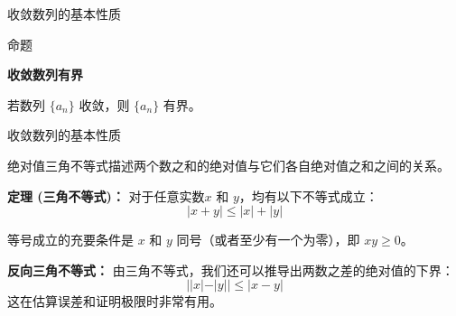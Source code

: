 \documentclass[aspectratio=169,10pt,fontset=fandol]{ctexbeamer}
\newenvironment{custom}[1]{\par\noindent\textbf{#1}\quad}{\par\vspace{0.8em}}
\begin{document}
\begin{frame}[t,fragile]{收敛数列的基本性质}
\footnotesize
\begin{block}{命题}
{\footnotesize
\textbf{收敛数列有界}\par

	若数列 $\{a_n\}$ 收敛，则 $\{a_n\}$ 有界。

}
\end{block}
\end{frame}
\begin{frame}[t,fragile]{收敛数列的基本性质}
\footnotesize
{\footnotesize
绝对值三角不等式描述两个数之和的绝对值与它们各自绝对值之和之间的关系。
	
	\textbf{定理 (三角不等式)：} 对于任意实数$x$ 和 $y$，均有以下不等式成立：
	\begin{equation*}
		|x + y| \le |x| + |y|
	\end{equation*}
	
	等号成立的充要条件是 $x$ 和 $y$ 同号（或者至少有一个为零），即 $xy \ge 0$。
	
	\textbf{反向三角不等式：} 由三角不等式，我们还可以推导出两数之差的绝对值的下界：
	\begin{equation*}
		||x| - |y|| \le |x - y|
	\end{equation*}
	这在估算误差和证明极限时非常有用。

}
\end{frame}
\end{document}
